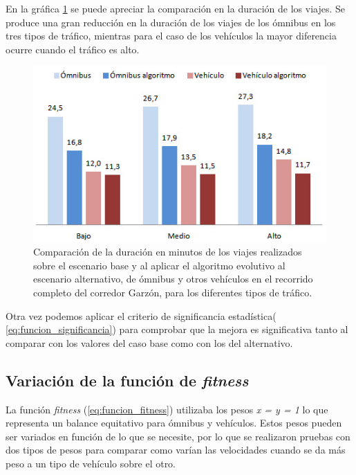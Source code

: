 En la gráfica \ref{fig:duracion_viajes_alernativo} se puede apreciar la comparación en la duración de los viajes. Se produce una gran reducción en la duración de los viajes de los ómnibus en los tres tipos de tráfico, mientras para el caso de los vehículos la mayor diferencia ocurre cuando el tráfico es alto.

\begin{figure}[H]
	\centering
	\includegraphics[width=0.8\linewidth]{Figures/duracio_viajes_alternativo}
	\caption[Comparación de la duración en minutos de los viajes sobre el escenario base y al aplicar el algoritmo evolutivo al escenario alternativo.]{Comparación de la duración en minutos de los viajes realizados sobre el escenario base y al aplicar el algoritmo evolutivo  al escenario alternativo, de ómnibus y otros vehículos en el recorrido completo del corredor Garzón, para los diferentes tipos de tráfico.}
	\label{fig:duracion_viajes_alernativo}
\end{figure}

Otra vez podemos aplicar el criterio de significancia estadística( \ref{eq:funcion_significancia}) para comprobar que la mejora es significativa tanto al comparar con los valores del caso base como con los del alternativo.

\subsection{Variación de la función de \emph{fitness}}

La función \emph{fitness} (\ref{eq:funcion_fitness}) utilizaba los pesos \emph{x = y = 1} lo que representa un balance equitativo  para ómnibus y vehículos. Estos pesos pueden ser variados en función de lo que se necesite, por lo que se realizaron pruebas con dos tipos de pesos para comparar como varían las velocidades cuando se da más peso a un tipo de vehículo sobre el otro.

